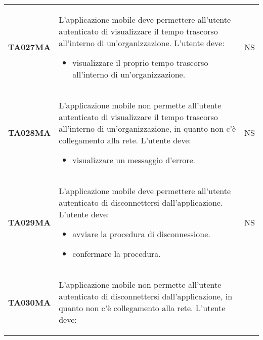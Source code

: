 \documentclass[../../piano-di-qualifica.tex]{subfiles}
\begin{document}
\begin{longtable}[H]{>{\centering\bfseries}m{3cm} >{}m{10cm} >{\centering\arraybackslash}m{3cm}}
  TA027MA           & L'applicazione mobile deve permettere all'utente autenticato di visualizzare il tempo trascorso all'interno di un'organizzazione. \newline
  L'utente deve:
  \begin{itemize}
    \item visualizzare il proprio tempo trascorso all'interno di un'organizzazione.
  \end{itemize}
                    & NS                                                                                                                                                                                                                                                               \\
  TA028MA           & L'applicazione mobile non permette all'utente autenticato di visualizzare il tempo trascorso all'interno di un'organizzazione, in quanto non c'è collegamento alla rete. \newline
  L'utente deve:
  \begin{itemize}
    \item visualizzare un messaggio d'errore.
  \end{itemize}
                    & NS                                                                                                                                                                                                                                                               \\
  TA029MA           & L'applicazione mobile deve permettere all'utente autenticato di disconnettersi dall'applicazione. \newline
  L'utente deve:
  \begin{itemize}
    \item avviare la procedura di disconnessione.
    \item confermare la procedura.
  \end{itemize}
                    & NS                                                                                                                                                                                                                                                               \\
  TA030MA           & L'applicazione mobile non permette all'utente autenticato di disconnettersi dall'applicazione, in quanto non c'è collegamento alla rete. \newline
  L'utente deve:
  \begin{itemize}

\end{itemize}
\end{longtable}
\end{document}

